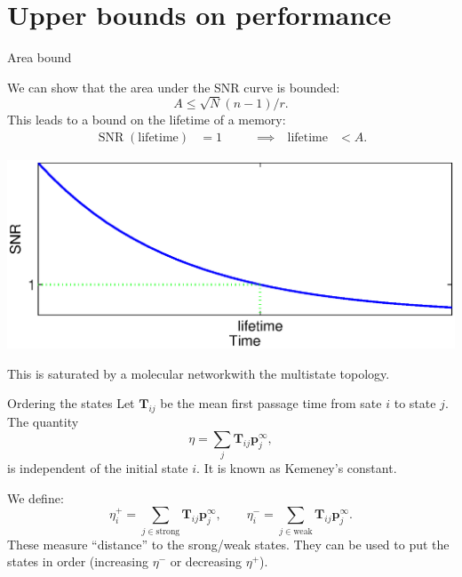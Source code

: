 \documentclass[final,hyperref={pdfpagelabels=false,bookmarks=false}]{beamer}
\newcommand{\citerr}[1]{\hfill {\footnotesize{\color{darkgrey}\cite{#1}}}}
\DeclareMathOperator{\SNR}{SNR}
\newcommand{\net}{molecular network}
\newcommand{\eq}{\mathbf{p}^\infty}
\newcommand{\fpt}{\mathbf{T}}
\begin{document}
\begin{frame}{}
\begin{columns}[t]
\begin{column}{0.37\linewidth}
\section{Upper bounds on performance}


\begin{block}{Area bound}
%
\parbox[c]{20cm}{
 We can show that the area under the SNR curve is bounded:
 \begin{equation*}
   A \leq \sqrt{N}(n-1)/r.
 \end{equation*}
 This leads to a bound on the lifetime of a memory:\\
 \begin{equation*}
 \begin{aligned}
   \SNR(\text{lifetime})&=1
   &\qquad
   \implies
   \quad
   \text{lifetime} &< A.
 \end{aligned}
 \end{equation*}
}
\hfill
\parbox[c]{16cm}{
 \begin{center}
   \includegraphics[width=15cm]{lifetime.eps}
 \end{center}
}
 
 This is saturated by a \net with the multistate topology.
%
\end{block}


\begin{block}{Ordering the states}
%
 Let $\fpt_{ij}$ be the mean first passage time from sate $i$ to state $j$. The quantity
 \begin{equation*}
   \eta = \sum_j \fpt_{ij} \eq_j,
 \end{equation*}
 is independent of the initial state $i$.
 It is known as Kemeney's constant. \citerr{kemeny1960finite}

 \vp We define:
 \begin{equation*}
   \eta^+_i = \sum_{j\in\text{strong}} \fpt_{ij} \eq_j,
   \qquad
   \eta^-_i = \sum_{j\in\text{weak}} \fpt_{ij} \eq_j.
 \end{equation*}
 These measure ``distance'' to the srong/weak states.
 They can be used to put the states in order (increasing $\eta^-$ or decreasing $\eta^+$).
%
\end{block}


\end{column}
\end{columns}
\end{frame}
\end{document}
